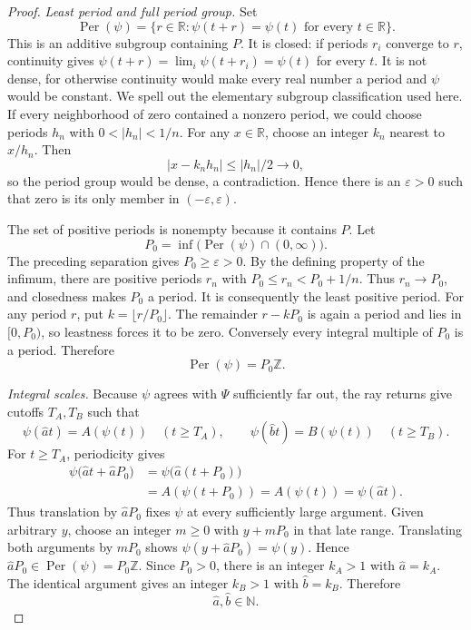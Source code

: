 \documentclass[11pt]{article}
\theoremstyle{definition}
\theoremstyle{remark}
\begin{document}
\begin{proof}
\smallskip
\noindent\emph{Least period and full period group.}
Set
\[
 \operatorname{Per}(\psi)
 =\{r\in\mathbb R:\psi(t+r)=\psi(t)\text{ for every }t\in\mathbb R\}.
\]
This is an additive subgroup containing \(P\).  It is closed: if periods
\(r_i\) converge to \(r\), continuity gives
\(\psi(t+r)=\lim_i\psi(t+r_i)=\psi(t)\) for every \(t\).
It is not dense, for otherwise continuity would make every real number a
period and \(\psi\) would be constant.  We spell out the elementary subgroup
classification used here.  If every neighborhood of zero contained a
nonzero period, we could choose periods \(h_n\) with
\(0<|h_n|<1/n\).  For any \(x\in\mathbb R\), choose an integer \(k_n\)
nearest to \(x/h_n\).  Then
\[
 |x-k_nh_n|\leq |h_n|/2\longrightarrow0,
\]
so the period group would be dense, a contradiction.  Hence there is an
\(\varepsilon>0\) such that zero is its only member in
\((-\varepsilon,\varepsilon)\).

The set of positive periods is nonempty because it contains \(P\).  Let
\[
 P_0=\inf\bigl(\operatorname{Per}(\psi)\cap(0,\infty)\bigr).
\]
The preceding separation gives \(P_0\geq\varepsilon>0\).  By the defining
property of the infimum, there are positive periods \(r_n\) with
\(P_0\leq r_n<P_0+1/n\).  Thus \(r_n\to P_0\), and closedness makes \(P_0\)
a period.  It is consequently the least positive period.  For any period
\(r\), put \(k=\lfloor r/P_0\rfloor\).  The remainder
\(r-kP_0\) is again a period and lies in \([0,P_0)\), so leastness forces it
to be zero.  Conversely every integral multiple of \(P_0\) is a period.
Therefore
\[
 \operatorname{Per}(\psi)=P_0\mathbb Z.
\]

\smallskip
\noindent\emph{Integral scales.}
Because \(\psi\) agrees with \(\Psi\) sufficiently far out, the ray returns
give cutoffs \(T_A,T_B\) such that
\[
 \psi(\widehat a t)=A(\psi(t))\quad(t\geq T_A),
 \qquad
 \psi(\widehat b t)=B(\psi(t))\quad(t\geq T_B).
\]
For \(t\geq T_A\), periodicity gives
\[
\begin{split}
 \psi\bigl(\widehat a t+\widehat aP_0\bigr)
 &=\psi\bigl(\widehat a(t+P_0)\bigr)\\
 &=A(\psi(t+P_0))
 =A(\psi(t))
 =\psi(\widehat a t).
\end{split}
\]
Thus translation by \(\widehat aP_0\) fixes \(\psi\) at every sufficiently
large argument.  Given arbitrary \(y\), choose an integer \(m\geq0\) with
\(y+mP_0\) in that late range.  Translating both arguments by \(mP_0\)
shows \(\psi(y+\widehat aP_0)=\psi(y)\).  Hence
\(\widehat aP_0\in\operatorname{Per}(\psi)=P_0\mathbb Z\).  Since \(P_0>0\),
there is an integer \(k_A>1\) with \(\widehat a=k_A\).  The identical
argument gives an integer \(k_B>1\) with \(\widehat b=k_B\).  Therefore
\begin{equation}\label{term:eq:integer-slopes}
 \widehat a,\widehat b\in\mathbb N.
\end{equation}


\end{proof}
\end{document}

